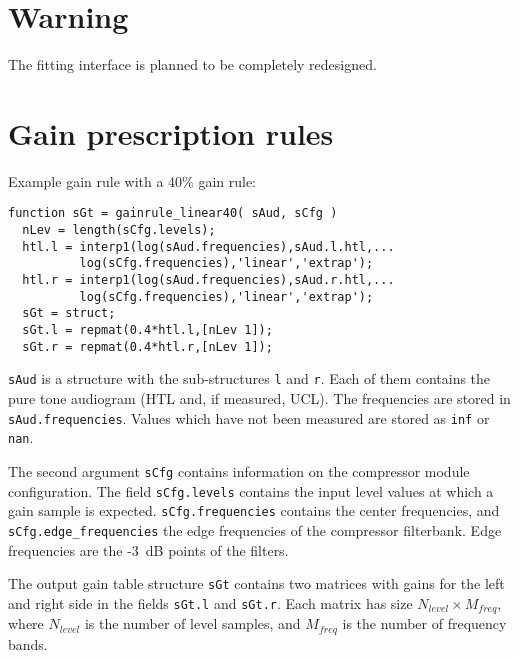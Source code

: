 \documentclass[11pt,a4paper,twoside]{article}
\begin{document}
\newpage
\MHAcopyright{}
\newpage
\tableofcontents
\newpage
{}

\section*{Warning}

The fitting interface is planned to be completely redesigned.

\section{Gain prescription rules}

Example gain rule with a 40\% gain rule:

\begin{verbatim}
function sGt = gainrule_linear40( sAud, sCfg )
  nLev = length(sCfg.levels);
  htl.l = interp1(log(sAud.frequencies),sAud.l.htl,...
		  log(sCfg.frequencies),'linear','extrap');
  htl.r = interp1(log(sAud.frequencies),sAud.r.htl,...
		  log(sCfg.frequencies),'linear','extrap');
  sGt = struct;
  sGt.l = repmat(0.4*htl.l,[nLev 1]);
  sGt.r = repmat(0.4*htl.r,[nLev 1]);
\end{verbatim}

\verb!sAud! is a structure with the sub-structures \verb!l! and
\verb!r!. Each of them contains the pure tone audiogram (HTL and, if
measured, UCL). The frequencies are stored in
\verb!sAud.frequencies!. Values which have not been measured are
stored as \verb!inf! or \verb!nan!.

The second argument \verb!sCfg! contains information on the compressor
module configuration. The field \verb!sCfg.levels! contains the input
level values at which a gain sample is
expected. \verb!sCfg.frequencies! contains the center frequencies, and
\verb!sCfg.edge_frequencies! the edge frequencies of the compressor
filterbank. Edge frequencies are the -3~dB points of the filters.

The output gain table structure \verb!sGt! contains two matrices with
gains for the left and right side in the fields \verb!sGt.l! and
\verb!sGt.r!. Each matrix has size $N_{level}\times M_{freq}$, where
$N_{level}$ is the number of level samples, and $M_{freq}$ is the
number of frequency bands.

%

\printindex
\end{document}
